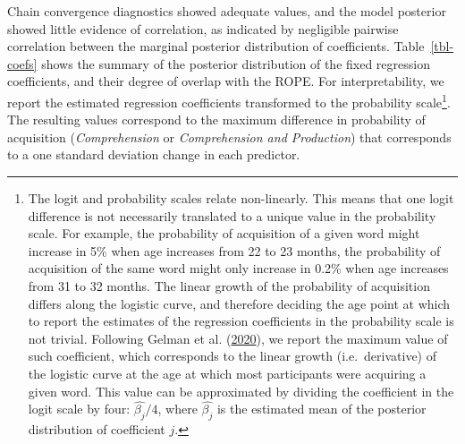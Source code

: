 \documentclass[
]{article}
\begin{document}
Chain convergence diagnostics showed adequate values, and the model
posterior showed little evidence of correlation, as indicated by
negligible pairwise correlation between the marginal posterior
distribution of coefficients. Table~\ref{tbl-coefs} shows the summary of
the posterior distribution of the fixed regression coefficients, and
their degree of overlap with the ROPE. For interpretability, we report
the estimated regression coefficients transformed to the probability
scale\footnote{The logit and probability scales relate non-linearly.
  This means that one logit difference is not necessarily translated to
  a unique value in the probability scale. For example, the probability
  of acquisition of a given word might increase in 5\% when age
  increases from 22 to 23 months, the probability of acquisition of the
  same word might only increase in 0.2\% when age increases from 31 to
  32 months. The linear growth of the probability of acquisition differs
  along the logistic curve, and therefore deciding the age point at
  which to report the estimates of the regression coefficients in the
  probability scale is not trivial. Following Gelman et al.
  (\protect\hyperlink{ref-gelman2020regression}{2020}), we report the
  maximum value of such coefficient, which corresponds to the linear
  growth (i.e.~derivative) of the logistic curve at the age at which
  most participants were acquiring a given word. This value can be
  approximated by dividing the coefficient in the logit scale by four:
  \(\hat{\beta_j}/4\), where \(\hat{\beta_j}\) is the estimated mean of
  the posterior distribution of coefficient \(j\).}. The resulting
values correspond to the maximum difference in probability of
acquisition (\emph{Comprehension} or \emph{Comprehension and
Production}) that corresponds to a one standard deviation change in each
predictor.
\end{document}
